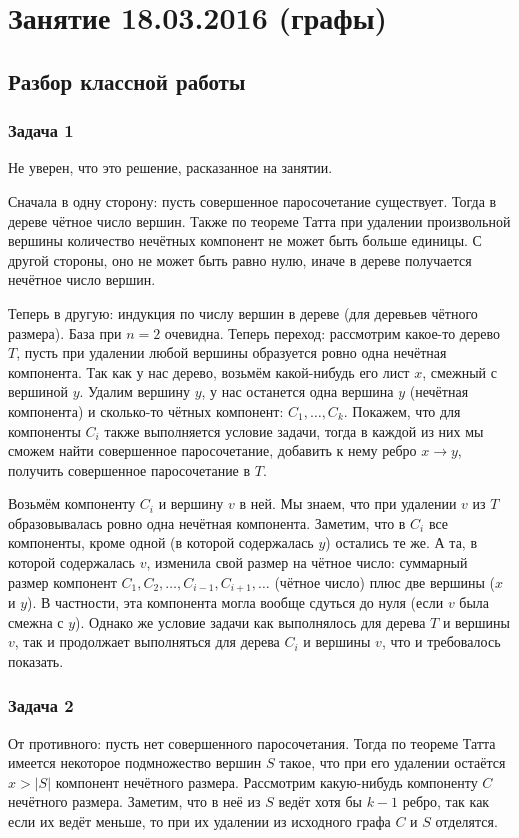 \chapter{Занятие 18.03.2016 (графы)}
\section{Разбор классной работы}

\subsection{Задача 1}
	\begin{Rem}
		Не уверен, что это решение, расказанное на занятии.
	\end{Rem}
	
	Сначала в одну сторону: пусть совершенное паросочетание существует.
	Тогда в дереве чётное число вершин.
	Также по теореме Татта при удалении произвольной вершины количество нечётных компонент
	не может быть больше единицы.
	С другой стороны, оно не может быть равно нулю, иначе в дереве получается нечётное число вершин.

	Теперь в другую: индукция по числу вершин в дереве (для деревьев чётного размера).
	База при $n=2$ очевидна.
	Теперь переход: рассмотрим какое-то дерево $T$, пусть при удалении любой вершины
	образуется ровно одна нечётная компонента.
	Так как у нас дерево, возьмём какой-нибудь его лист $x$, смежный с вершиной $y$.
	Удалим вершину $y$, у нас останется одна вершина $y$ (нечётная компонента) и сколько-то чётных компонент: $C_1, \dots, C_k$.
	Покажем, что для компоненты $C_i$ также выполняется условие задачи, тогда в каждой из них мы сможем найти
	совершенное паросочетание, добавить к нему ребро $x \to y$, получить совершенное паросочетание в $T$.

	Возьмём компоненту $C_i$ и вершину $v$ в ней.
	Мы знаем, что при удалении $v$ из $T$ образовывалась ровно одна нечётная компонента.
	Заметим, что в $C_i$ все компоненты, кроме одной (в которой содержалась $y$) остались те же.
	А та, в которой содержалась $v$, изменила свой размер на чётное число: суммарный размер
	компонент $C_1, C_2, \dots, C_{i-1}, C_{i+1}, \dots$ (чётное число) плюс две вершины ($x$ и $y$).
	В частности, эта компонента могла вообще сдуться до нуля (если $v$ была смежна с $y$).
	Однако же условие задачи как выполнялось для дерева $T$ и вершины $v$, так и продолжает выполняться
	для дерева $C_i$ и вершины $v$, что и требовалось показать.

\subsection{Задача 2}
	От противного: пусть нет совершенного паросочетания.
	Тогда по теореме Татта имеется некоторое подмножество вершин $S$ такое,
	что при его удалении остаётся $x>|S|$ компонент нечётного размера.
	Рассмотрим какую-нибудь компоненту $C$ нечётного размера.
	Заметим, что в неё из $S$ ведёт хотя бы $k-1$ ребро, так как если их ведёт меньше,
	то при их удалении из исходного графа $C$ и $S$ отделятся.

